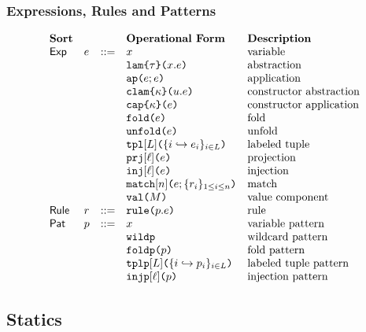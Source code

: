 \subsubsection{Expressions, Rules and Patterns}
\[\begin{array}{lllllll}
\textbf{Sort} & & & \textbf{Operational Form} 
& \textbf{Description}\\
\mathsf{Exp} & e & ::= & x 
& \text{variable}\\
&&& \aelam{\tau}{x}{e} 
& \text{abstraction}\\
&&& \aeap{e}{e} 
& \text{application}\\
&&& \aeclam{\kappa}{u}{e} %
& \text{constructor abstraction}\\
&&& \aecap{e}{\kappa} %
& \text{constructor application}\\
&&& \aefold{e} %
& \text{fold}\\
&&& \aeunfold{e} %
& \text{unfold}\\
&&& \aetpl{\labelset}{\mapschema{e}{i}{\labelset}} 
& \text{labeled tuple}\\
&&& \aepr{\ell}{e} 
& \text{projection}\\
&&& \aein{\ell}{e} 
& \text{injection}\\
&&& \aematchwith{n}{e}{\seqschemaX{r}} 
& \text{match}\\
&&& \amval{M} 
& \text{value component}\\
\mathsf{Rule} & r & ::= & \aematchrule{p}{e} 
& \text{rule}\\
\mathsf{Pat} & p & ::= & x 
& \text{variable pattern}\\
&&& \aewildp 
& \text{wildcard pattern}\\
&&& \aefoldp{p} 
& \text{fold pattern}\\
&&& \aetplp{\labelset}{\mapschema{p}{i}{\labelset}} 
& \text{labeled tuple pattern}\\
&&& \aeinjp{\ell}{p} 
& \text{injection pattern}
\end{array}\]

\subsection{Statics}\label{appendix:P-statics}
